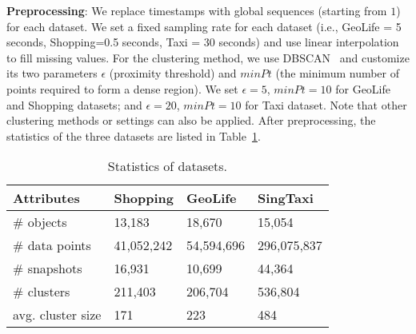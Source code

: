 \textbf{Preprocessing}: We replace timestamps with global sequences (starting from $1$) for each dataset. 
We set a fixed sampling rate for each dataset (i.e., GeoLife = 5 seconds, Shopping=0.5 seconds, Taxi = 30 seconds)
and use linear interpolation to fill missing values.
For the clustering method, we use DBSCAN~\cite{ester1996density} and customize its two parameters $\epsilon$ (proximity threshold) and $minPt$ (the minimum number of points required to form a dense region). We set $\epsilon=5$, $minPt=10$ for GeoLife and Shopping datasets; and $\epsilon=20$, $minPt=10$ for Taxi dataset. Note that other clustering methods or settings can also be applied. 
After preprocessing, the statistics of the three datasets are listed in Table~\ref{exp:dataset}. 

\begin{table} [h]
\center
\small
\begin{tabular}{|l|l|l|l|}
\hline
 \textbf{Attributes}& \textbf{Shopping} &  \textbf{GeoLife} &  \textbf{SingTaxi} \\ 
\hline 
\# objects  & 13,183 & 18,670 & 15,054\\ 
\hline
\# data points  & 41,052,242 & 54,594,696 & 296,075,837\\ 
\hline
\# snapshots  & 16,931 & 10,699 & 44,364\\ 
\hline
\# clusters  & 211,403  & 206,704& 536,804\\
\hline
avg. cluster size  & 171 & 223 & 484\\
\hline
\end{tabular}
\caption{Statistics of datasets.}
\label{exp:dataset}
\end{table}

